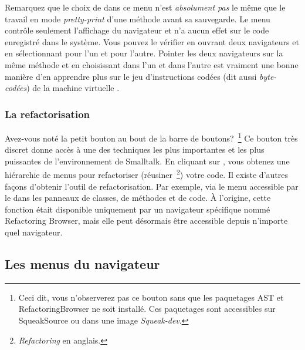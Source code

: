 \documentclass[a4paper,10pt,twoside]{book}
\begin{document}
Remarquez que le choix de  dans ce menu n'est \emph{absolument pas} le m\^eme que le travail en mode \emph{pretty-print} d'une m\'ethode
avant sa sauvegarde.
Le menu contr\^ole seulement l'affichage du navigateur et n'a aucun effet sur
le code enregistr\'e dans le syst\`eme.
Vous pouvez le v\'erifier en ouvrant deux navigateurs et en s\'electionnant
 pour l'un et  pour l'autre.
Pointer les deux navigateurs sur la m\^eme m\'ethode et en choisissant
 dans l'un et  dans l'autre est vraiment
une bonne mani\`ere d'en apprendre plus sur le jeu d'instructions cod\'ees
(dit aussi \emph{byte-cod\'ees}) de la machine virtuelle \sq.

\subsubsection{La refactorisation}


Avez-vous not\'e la petit bouton  au bout de la barre de 
boutons?~\footnote{Ceci dit, vous n'observerez pas ce bouton sans
que les paquetages AST et RefactoringBrowser ne soit install\'e. Ces
paquetages sont accessibles sur SqueakSource ou dans une image \emph{Squeak-dev}.}
Ce bouton tr\`es discret donne acc\`es \`a une des techniques
les plus importantes et les plus puissantes de l'environnement de
Smalltalk.
En cliquant sur , vous obtenez une hi\'erarchie de menus
pour refactoriser (\cad r\'eusiner~\footnote{\emph{Refactoring} en anglais.}) votre code.
Il existe d'autres fa\c{c}ons d'obtenir l'outil de refactorisation. Par
exemple, via le menu accessible par le  dans les
panneaux de classes, de m\'ethodes et de code.
\`A l'origine, cette fonction \'etait disponible uniquement
par un navigateur sp\'ecifique nomm\'e Refactoring Browser, mais
elle peut d\'esormais \^etre accessible depuis n'importe quel navigateur.

\subsection{Les menus du navigateur}
\end{document}

